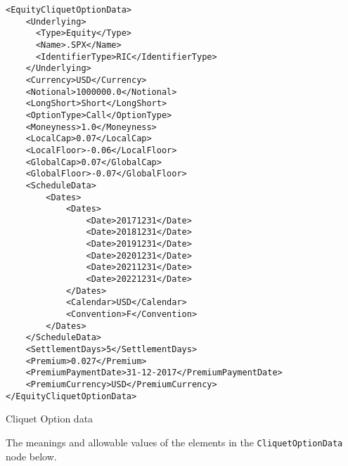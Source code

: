 \begin{listing}[H]
	\begin{verbatim}
<EquityCliquetOptionData>
    <Underlying>
      <Type>Equity</Type>
      <Name>.SPX</Name>
      <IdentifierType>RIC</IdentifierType>
    </Underlying>
    <Currency>USD</Currency>
    <Notional>1000000.0</Notional>
    <LongShort>Short</LongShort>
    <OptionType>Call</OptionType>
    <Moneyness>1.0</Moneyness>
    <LocalCap>0.07</LocalCap>
    <LocalFloor>-0.06</LocalFloor>
    <GlobalCap>0.07</GlobalCap>
    <GlobalFloor>-0.07</GlobalFloor>
    <ScheduleData>
        <Dates>
            <Dates>
                <Date>20171231</Date>
                <Date>20181231</Date>
                <Date>20191231</Date>
                <Date>20201231</Date>
                <Date>20211231</Date>
                <Date>20221231</Date>
            </Dates>
            <Calendar>USD</Calendar>
            <Convention>F</Convention>
        </Dates>    
    </ScheduleData>
    <SettlementDays>5</SettlementDays>
    <Premium>0.027</Premium>
    <PremiumPaymentDate>31-12-2017</PremiumPaymentDate>
    <PremiumCurrency>USD</PremiumCurrency>
</EquityCliquetOptionData>
    \end{verbatim}
    \caption{Cliquet Option data}
	\label{lst:cliquetoption_data}
\end{listing}

The meanings and allowable values of the elements in the \lstinline!CliquetOptionData! node below.

